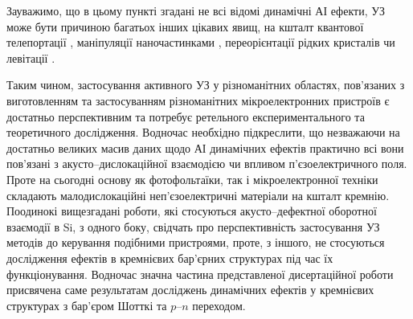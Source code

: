 









Зауважимо, що в цьому пункті згадані не всі відомі динамічні АІ ефекти,
УЗ може бути причиною багатьох інших цікавих явищ, на кшталт квантової телепортації \cite{Buscemi}, маніпуляції наночастинками \cite{Cuberes,Olikh:SPQEO2010}, переорієнтації рідких кристалів \cite{US:levit} чи левітації \cite{US:levit}.

Таким чином, застосування активного УЗ у різноманітних областях, пов'язаних з виготовленням та застосуванням різноманітних мікроелектронних пристроїв є достатньо перспективним та потребує ретельного експериментального та теоретичного дослідження.
Водночас необхідно підкреслити, що незважаючи на достатньо великих масив даних щодо АІ динамічних ефектів практично всі вони пов'язані з акусто--дислокаційної взаємодією чи впливом п'єзоелектричного поля.
Проте на сьогодні основу як фотофольтаїки, так і мікроелектронної техніки складають малодислокаційні неп'єзоелектричні матеріали на кшталт кремнію.
Поодинокі вищезгадані роботи, які стосуються акусто--дефектної оборотної взаємодії в Si, з одного боку,
свідчать про перспективність застосування УЗ методів до керування подібними пристроями,
проте, з іншого, не стосуються дослідження ефектів в кремнієвих бар'єрних структурах під час їх функціонування.
Водночас значна частина представленої дисертаційної роботи присвячена саме результатам досліджень динамічних ефектів у кремнієвих структурах з бар'єром Шотткі та $p$--$n$ переходом.


